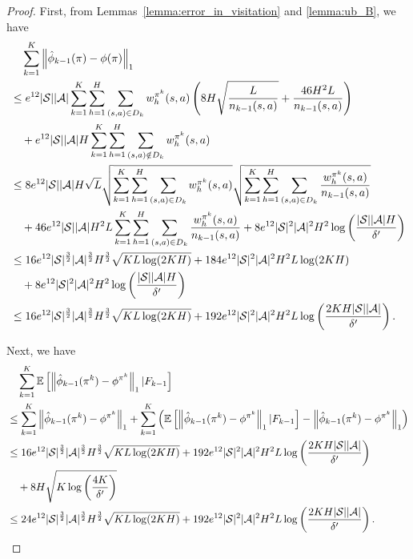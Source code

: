 \begin{proof}
	First, from Lemmas~\ref{lemma:error_in_visitation} and \ref{lemma:ub_B}, we have
	\begin{align*}
		&\quad \sum_{k=1}^{K} \left\|  \hat{\phi}_{k-1}(\pi) - \phi(\pi)  \right\|_1 
		\\
		&\leq e^{12} |\mathcal{S}||\mathcal{A}| \sum_{k=1}^{K} \sum_{h=1}^{H} \sum_{(s,a) \in D_k}  w^{\pi^k}_h(s,a)  \left(  8 H \sqrt{ \frac{L}{n_{k-1}(s,a)} }  + \frac{46  H^2L}{n_{k-1}(s,a)}  \right) 
		\\
		&\quad + e^{12} |\mathcal{S}||\mathcal{A}|H \sum_{k=1}^{K} \sum_{h=1}^{H} \sum_{(s,a) \notin D_k}  w^{\pi^k}_h(s,a)
		\\
		&\leq  8 e^{12} |\mathcal{S}||\mathcal{A}| H \sqrt{L} \sqrt{\sum_{k=1}^{K} \sum_{h=1}^{H} \sum_{(s,a) \in D_k}  w^{\pi^k}_h(s,a) }  \sqrt{ \sum_{k=1}^{K} \sum_{h=1}^{H} \sum_{(s,a) \in D_k} \frac{w^{\pi^k}_h(s,a)}{n_{k-1}(s,a)} }  \\
		&\quad + 46 e^{12} |\mathcal{S}||\mathcal{A}| H^2L \sum_{k=1}^{K} \sum_{h=1}^{H} \sum_{(s,a) \in D_k}   \frac{ w^{\pi^k}_h(s,a) }{n_{k-1}(s,a)}  
		+ 8e^{12} |\mathcal{S}|^2 |\mathcal{A}|^2 H^2  \log\left( \frac{|\mathcal{S}||\mathcal{A}|H}{\delta'} \right)
		\\
		&\leq  16 e^{12} |\mathcal{S}|^{\frac{3}{2}} |\mathcal{A}|^{\frac{3}{2}} H^{\frac{3}{2}}  \sqrt{ KL\log(2KH) } + 184 e^{12} |\mathcal{S}|^2 |\mathcal{A}|^2 H^2L \log(2KH)  
		\\
		&\quad + 8e^{12} |\mathcal{S}|^2 |\mathcal{A}|^2 H^2  \log\left( \frac{|\mathcal{S}||\mathcal{A}|H}{\delta'} \right) 
		\\
		&\leq  16 e^{12} |\mathcal{S}|^{\frac{3}{2}} |\mathcal{A}|^{\frac{3}{2}} H^{\frac{3}{2}}  \sqrt{ KL\log(2KH) } + 192 e^{12} |\mathcal{S}|^2 |\mathcal{A}|^2 H^2L \log\left( \frac{2KH|\mathcal{S}||\mathcal{A}|}{\delta'} \right) .
	\end{align*}
	
	Next, we have
	\begin{align*}
		&\quad \sum_{k=1}^{K} \mathbb{E}\left[  \left\|  \hat{\phi}_{k-1}(\pi^k) - \phi^{\pi^k}  \right\|_1 | F_{k-1}  \right] 
		\\
		&\leq \sum_{k=1}^{K} \left\|  \hat{\phi}_{k-1}(\pi^k) - \phi^{\pi^k}  \right\|_1 + \sum_{k=1}^{K} \left( \mathbb{E}\left[  \left\|  \hat{\phi}_{k-1}(\pi^k) - \phi^{\pi^k}  \right\|_1 | F_{k-1}  \right] - \left\|  \hat{\phi}_{k-1}(\pi^k) - \phi^{\pi^k}  \right\|_1  \right)
		\\
		&\leq 16 e^{12} |\mathcal{S}|^{\frac{3}{2}} |\mathcal{A}|^{\frac{3}{2}} H^{\frac{3}{2}}  \sqrt{ KL\log(2KH) } + 192 e^{12} |\mathcal{S}|^2 |\mathcal{A}|^2 H^2L \log\left( \frac{2KH|\mathcal{S}||\mathcal{A}|}{\delta'} \right) 
		\\
		&\quad + 8H \sqrt{ K \log\left( \frac{4K}{\delta'} \right) } 
		\\
		&\leq 24 e^{12} |\mathcal{S}|^{\frac{3}{2}} |\mathcal{A}|^{\frac{3}{2}} H^{\frac{3}{2}}  \sqrt{ KL\log(2KH) } + 192 e^{12} |\mathcal{S}|^2 |\mathcal{A}|^2 H^2L \log\left( \frac{2KH|\mathcal{S}||\mathcal{A}|}{\delta'} \right) .
	\end{align*}
\end{proof}


